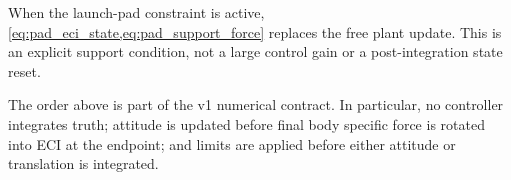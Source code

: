When the launch-pad constraint is active,
\cref{eq:pad_eci_state,eq:pad_support_force} replaces the free plant update.
This is an explicit support condition, not a large control gain or a
post-integration state reset.

\begin{implbox}
The order above is part of the v1 numerical contract. In particular, no
controller integrates truth; attitude is updated before final body specific
force is rotated into ECI at the endpoint; and limits are applied before
either attitude or translation is integrated.
\end{implbox}
